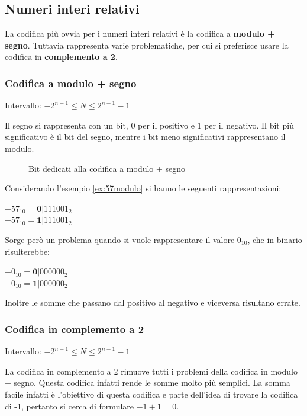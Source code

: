 \documentclass[a4paper]{article}
\theoremstyle{break}
\theoremstyle{break}
\theoremstyle{break}
\theoremstyle{break}
\begin{document}
\subsection{Numeri interi relativi}
La codifica più ovvia per i numeri interi relativi è la codifica a
\textbf{modulo + segno}. Tuttavia rappresenta varie problematiche, per cui
si preferisce usare la codifica in \textbf{complemento a 2}.

\subsubsection{Codifica a modulo + segno}
\begin{center}
	Intervallo: \( -2^{n-1} \le N \le 2^{n-1}-1 \)
\end{center}
Il segno si rappresenta con un bit, 0 per il positivo e 1 per il negativo.
Il bit più significativo è il bit del segno, mentre i bit meno significativi
rappresentano il modulo.

\begin{figure}[H]
    \begin{center}
    \end{center}
    \caption{Bit dedicati alla codifica a modulo + segno} 
\end{figure}
Considerando l'esempio \ref{ex:57modulo} si hanno le seguenti rappresentazioni:

\begin{center}
	\( +57_{10}=\textbf{0}|111001_2 \)\\
	\( -57_{10}=\textbf{1}|111001_2 \)
\end{center}
Sorge però un problema quando si vuole rappresentare il valore \( 0_{10} \),
che in binario risulterebbe:

\begin{center}
	\( +0_{10}=\textbf{0}|000000_2 \)\\
	\( -0_{10}=\textbf{1}|000000_2 \)
\end{center}
Inoltre le somme che passano dal positivo al negativo e viceversa risultano errate.

\subsubsection{Codifica in complemento a 2}
\begin{center}
	Intervallo: \( -2^{n-1} \le N \le 2^{n-1}-1 \)
\end{center}
La codifica in complemento a 2 rimuove tutti i problemi della codifica in modulo
+ segno. Questa codifica infatti rende le somme molto più semplici. La somma facile
infatti è l'obiettivo di questa codifica e parte dell'idea di trovare la
codifica di -1, pertanto si cerca di formulare \( -1+1=0 \).
\end{document}

